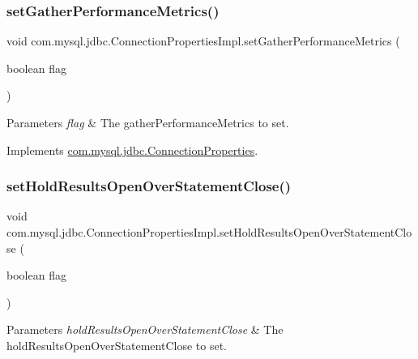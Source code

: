 \subsubsection{\texorpdfstring{set\+Gather\+Performance\+Metrics()}{setGatherPerformanceMetrics()}}
{\footnotesize\ttfamily void com.\+mysql.\+jdbc.\+Connection\+Properties\+Impl.\+set\+Gather\+Performance\+Metrics (\begin{DoxyParamCaption}\item[{boolean}]{flag }\end{DoxyParamCaption})}


\begin{DoxyParams}{Parameters}
{\em flag} & The gather\+Performance\+Metrics to set. \\
\hline
\end{DoxyParams}


Implements \mbox{\hyperlink{interfacecom_1_1mysql_1_1jdbc_1_1_connection_properties_a8083ba3dcac8d6d8ec42c635f0f19be4}{com.\+mysql.\+jdbc.\+Connection\+Properties}}.

\mbox{\label{classcom_1_1mysql_1_1jdbc_1_1_connection_properties_impl_a4d50d1c91f82a50ecff1012758beaa75}} 
\subsubsection{\texorpdfstring{set\+Hold\+Results\+Open\+Over\+Statement\+Close()}{setHoldResultsOpenOverStatementClose()}}
{\footnotesize\ttfamily void com.\+mysql.\+jdbc.\+Connection\+Properties\+Impl.\+set\+Hold\+Results\+Open\+Over\+Statement\+Close (\begin{DoxyParamCaption}\item[{boolean}]{flag }\end{DoxyParamCaption})}


\begin{DoxyParams}{Parameters}
{\em hold\+Results\+Open\+Over\+Statement\+Close} & The hold\+Results\+Open\+Over\+Statement\+Close to set. \\
\hline
\end{DoxyParams}


